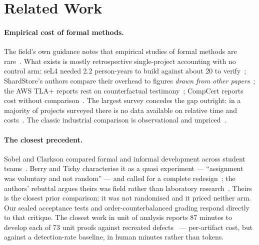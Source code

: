 \documentclass[runningheads]{llncs}
\begin{document}
\section{Related Work}

\paragraph{Empirical cost of formal methods.} The field's own guidance notes
that empirical studies of formal methods are rare~\cite{terbeek2022}. What
exists is mostly retrospective single-project accounting with no control arm:
seL4 needed 2.2 person-years to build against about 20 to
verify~\cite{staples2014,klein2009}; ShardStore's authors compare their
overhead to figures \emph{drawn from other papers}~\cite{bornholt2021}; the
AWS TLA+ reports rest on counterfactual testimony~\cite{newcombe2015};
CompCert reports cost without comparison~\cite{leroy2009}. The largest survey
concedes the gap outright: in a majority of projects surveyed there is no
data available on relative time and costs~\cite{woodcock2009}. The classic
industrial comparison is observational and unpriced~\cite{pfleeger1997}.

\paragraph{The closest precedent.} Sobel and Clarkson compared formal and
informal development across student teams~\cite{sobel2002}. Berry and Tichy
characterise it as a quasi experiment --- ``assignment was voluntary and not
random'' --- and called for a complete redesign~\cite{berry2003}; the
authors' rebuttal argues theirs was field rather than laboratory
research~\cite{sobel2003}. Theirs is the closest prior comparison; it was not
randomised and it priced neither arm. Our sealed acceptance tests and
order-counterbalanced grading respond directly to that critique. The closest
work in unit of analysis reports 87 minutes to develop each of 73 unit proofs
against recreated defects~\cite{amusuo2025} --- per-artifact cost, but
against a detection-rate baseline, in human minutes rather than tokens.
\end{document}
